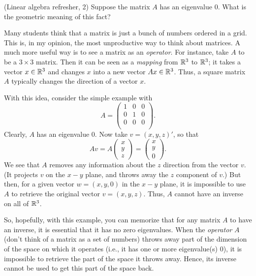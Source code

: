 \begin{exercise}(Linear algebra refresher, 2) Suppose the matrix $A$
  has an eigenvalue $0$. What is the geometric meaning of this fact? 
  \begin{solution}
    Many students think that a matrix is just a bunch of numbers
    ordered in a grid. This is, in my opinion, the most unproductive
    way to think about matrices. A much more useful way is to see a
    matrix as an \emph{operator}. For instance, take $A$ to be a
    $3\times3$ matrix. Then it can be seen as a \emph{mapping} from
    $\mathbb{R}^3$ to $\mathbb{R}^3$; it takes a vector $x\in\mathbb{R}^3$ and changes $x$
    into a new vector $Ax\in \mathbb{R}^3$. Thus, a square matrix $A$ typically changes the
 direction of a vector $x$. 

With this idea, consider the simple example with
    \begin{equation*}
A =
    \begin{pmatrix}
      1 & 0 & 0 \\ 
      0 & 1 & 0 \\ 
      0 & 0 & 0 \\ 
    \end{pmatrix}.
  \end{equation*}
Clearly, $A$ has an eigenvalue $0$. Now take $v=(x,y,z)'$, so that
    \begin{equation*}
A v = A
 \begin{pmatrix}
x\\
y\\
z
    \end{pmatrix}
= \begin{pmatrix}
x\\
y\\
0
    \end{pmatrix}.
  \end{equation*}
  We see that $A$ removes any information about the $z$ direction from
  the vector $v$. (It projects $v$ on the $x-y$ plane, and throws away
  the $z$ component of $v$.) But then, for a given vector $w=(x,y,0)$
  in the $x-y$ plane, it is impossible to use $A$ to retrieve the
  original vector $v=(x,y,z)$. Thus, $A$ cannot have an inverse on all
  of $\mathbb{R}^3$.

  So, hopefully, with this example, you can memorize that for any
  matrix $A$ to have an inverse, it is essential that it has no zero
  eigenvalues. When the \emph{operator} $A$ (don't think of a matrix
  as a set of numbers) throws away part of the dimension of the space
  on which it operates (i.e., it has one or more eigenvalue(s) $0$), it is impossible to retrieve the part of the space it throws away. Hence, its inverse cannot be used to get this part of the space back. 

\end{solution}


\end{exercise}


